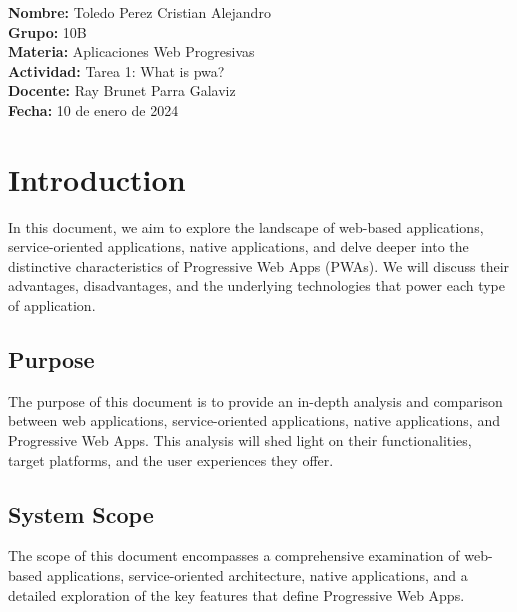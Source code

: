\documentclass[12pt,a4paper, twosite]{article}
\date{}
\title{}
\author{}
\begin{document}
\maketitle
\begin{center}
  \textbf{Nombre:} Toledo Perez Cristian Alejandro \\
  \textbf{Grupo:} 10B \\
  \textbf{Materia:} Aplicaciones Web Progresivas \\
  \textbf{Actividad:} Tarea 1: What is pwa? \\
  \textbf{Docente:} Ray Brunet Parra Galaviz \\
  \textbf{Fecha:} 10 de enero de 2024
\end{center}

\newpage
\tableofcontents

\newpage

\section{Introduction}
\label{sec:org60390fa}

In this document, we aim to explore the 
landscape of web-based applications, service-oriented 
applications, native applications, and delve deeper 
into the distinctive characteristics of Progressive Web Apps 
(PWAs). We will discuss their advantages, disadvantages, and 
the underlying technologies that power each type of application. 


\subsection{Purpose}
\label{sec:org434c3ef}

The purpose of this document is to provide 
an in-depth analysis and comparison between 
web applications, service-oriented applications, 
native applications, and Progressive Web Apps. This 
analysis will shed light on their functionalities, 
target platforms, and the user experiences they offer.

\subsection{System Scope}
\label{sec:org12e44a1}

The scope of this document encompasses 
a comprehensive examination of web-based 
applications, service-oriented architecture, 
native applications, and a detailed exploration 
of the key features that define Progressive Web Apps.
\end{document}
